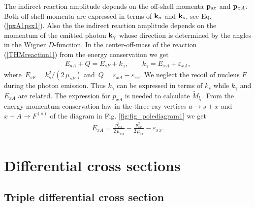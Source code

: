 \documentclass[prl,unsortedaddress,groupedaddress,twocolumn,amsmath,amsfonts,amssymb,showpacs,floatfix,nofootinbib]{revtex4}
\begin{document}
The indirect reaction amplitude  depends on the off-shell momenta ${\rm {\bf p}}_{sx}$ and 
${\rm {\bf p}}_{xA}$. Both off-shell momenta are expressed in terms of ${\rm {\bf k}}_{a}$ and ${\rm {\bf k}}_{s}$, see Eq. (\ref{pxA1psx1}). Also the the indirect reaction amplitude depends on the momentum of the emitted photon ${\rm {\bf k}}_{\gamma}$  whose direction is determined by the angles in the Wigner $D$-function. 
 In the center-off-mass of the  reaction 
(\ref{THMreaction1}) from the energy conservation we get
\begin{align}
E_{aA} + Q = E_{sF} + k_{\gamma}, \qquad  k_{\gamma} = E_{xA} + \varepsilon_{xA}, 
\label{energconserv1}
\end{align}
where $\,E_{sF}= k_{s}^{2}/(2\,\mu_{sF})$ and $\,Q=\varepsilon_{xA} - \varepsilon_{sx}$. We neglect the recoil of nucleus $F$ during the photon emission. Thus $k_{\gamma}$ can be expressed in terms of  $k_{s}$ while $k_{\gamma}$ and $E_{xA}$ are related.
The expression for $p_{xA}$ is needed to calculate ${\tilde M}_{l_{i}}$. From the energy-momentum conservation law in the three-ray vertices $a \to s+x$ and $ x+ A \to F^{(s)}$ of the diagram in Fig. \ref{fig:fig_polediagram1} we get \cite{reviewpaper}
\begin{align}
E_{xA}= \frac{p_{xA}^{2}}{2\,\mu_{xA}} - \frac{p_{sx}^{2}}{2\,\mu_{sx}} -\varepsilon_{s\,x}.
\label{ExApxA1}
\end{align}

\section{ Differential cross sections}
\label{difcrsct1}

\subsection{Triple differential cross section}
\end{document}
